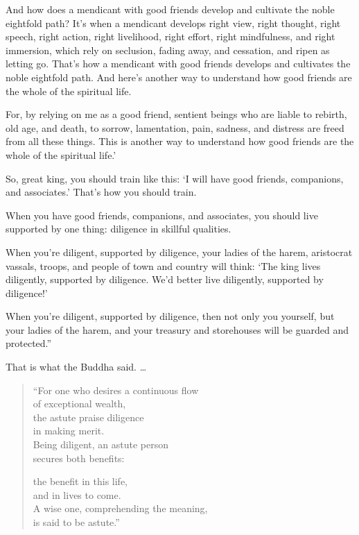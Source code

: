 \documentclass[12pt,openany]{book}%
\begin{document}
And how does a mendicant with good friends develop and cultivate the noble eightfold path? It’s when a mendicant develops right view, right thought, right speech, right action, right livelihood, right effort, right mindfulness, and right immersion, which rely on seclusion, fading away, and cessation, and ripen as letting go. That’s how a mendicant with good friends develops and cultivates the noble eightfold path. And here’s another way to understand how good friends are the whole of the spiritual life. 

For, by relying on me as a good friend, sentient beings who are liable to rebirth, old age, and death, to sorrow, lamentation, pain, sadness, and distress are freed from all these things. This is another way to understand how good friends are the whole of the spiritual life.’ 

So, great king, you should train like this: ‘I will have good friends, companions, and associates.’ That’s how you should train. 

When you have good friends, companions, and associates, you should live supported by one thing: diligence in skillful qualities. 

When you’re diligent, supported by diligence, your ladies of the harem, aristocrat vassals, troops, and people of town and country will think: ‘The king lives diligently, supported by diligence. We’d better live diligently, supported by diligence!’ 

When you’re diligent, supported by diligence, then not only you yourself, but your ladies of the harem, and your treasury and storehouses will be guarded and protected.” 

That is what the Buddha said. … 

\begin{verse}%
“For one who desires a continuous flow \\
of exceptional wealth, \\
the astute praise diligence \\
in making merit. \\
Being diligent, an astute person \\
secures both benefits: 

the benefit in this life, \\
and in lives to come. \\
A wise one, comprehending the meaning, \\
is said to be astute.” 

%
\end{verse}
\end{document}
